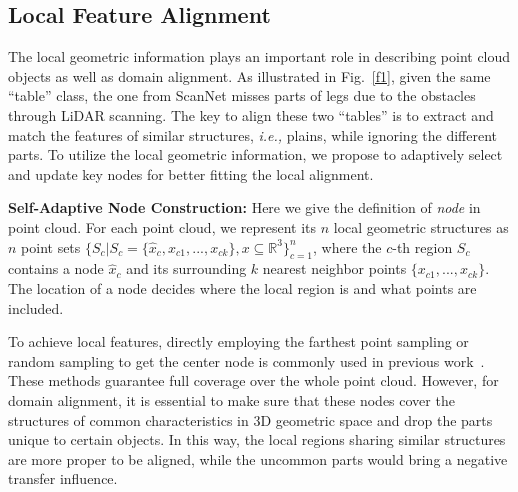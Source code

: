 \documentclass{article}
\begin{document}
\subsection{Local Feature Alignment}

The local geometric information plays an important role in describing point cloud objects as well as domain alignment. As illustrated in Fig.~\ref{f1}, given the same “table” class, the one from ScanNet misses parts of legs due to the obstacles through LiDAR scanning. The key to align these two “tables” is to extract and match the features of similar structures, \textit{i.e.,} plains, while ignoring the different parts. To utilize the local geometric information, we propose to adaptively select and update key nodes for better fitting the local alignment.

\textbf{Self-Adaptive Node Construction:} Here we give the definition of \textit{node} in point cloud. For each point cloud, we represent its $n$ local geometric structures as $n$ point sets $\{S_c|S_c=\{\hat{x}_c, x_{c1},...,x_{ck}\}, x\subseteq \mathbb{R}^3\}^n_{c=1}$, where the $c$-th region $S_c$ contains a node $\hat{x}_c$ and its surrounding $k$ nearest neighbor points $\{x_{c1},...,x_{ck}\}$. The location of a node decides where the local region is and what points are included.

To achieve local features, directly employing the farthest point sampling or random sampling to get the center node is commonly used in previous work~\cite{qi2017pointnet++,li2018pointcnn}. These methods guarantee full coverage over the whole point cloud. However, for domain alignment, it is essential to make sure that these nodes cover the structures of common characteristics in 3D geometric space and drop the parts unique to certain objects. In this way, the local regions sharing similar structures are more proper to be aligned, while the uncommon parts would bring a negative transfer influence.
\end{document}
